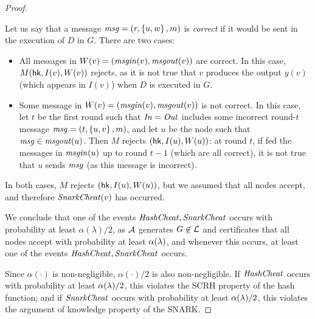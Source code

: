 \begin{proof}
\begin{itemize}
			Let us say that a message $\mathit{ msg } = (r, \left \{{u,w} \right \}, m)$
			is \emph{correct} if it would be sent in the execution of $D$ in $G$.
			There are two cases:
			\begin{itemize}
				\item All messages in $W(v) = (\mathit{ msgin }(v), \mathit{ msgout }(v))$
					are correct.
					In this case, $M( \mathsf{hk}, I(v), W(v))$
					rejects, as it is not true that $v$
					produces the output $y(v)$ (which appears in $I(v)$)
					when $D$ is executed in $G$.
				\item Some message in $W(v) = (\mathit{ msgin }(v), \mathit{ msgout }(v))$
					is not correct.
					In this case,
				let $t$ be the first round such that $\mathit{ In } = \mathit{ Out }$ 
			includes some incorrect round-$t$ message $\mathit{ msg } = (t, \left \{{u,v} \right \}, m)$,
			and let $u$ be the node such that $\mathit{ msg } \in \mathit{ msgout }(u)$.
			Then $M$ rejects $(\mathsf{hk}, I(u), W(u))$:
			at round $t$, if fed the messages in $\mathit{ msgin }(u)$ up to round $t - 1$
			(which are all correct),
			it is not true that $u$ sends $\mathit{ msg }$ (as this message is incorrect).
			\end{itemize}
			In both cases, $M$ rejects $(\mathsf{hk}, I(u), W(u))$,
			but we assumed that all nodes accept,
			and therefore $\mathit{ SnarkCheat }(v)$ has occurred.
	\end{itemize}
	We conclude that one of the events $\mathit{ HashCheat },\mathit{ SnarkCheat }$
	occurs with probability at least $\alpha(\lambda)/2$,
	as $\mathcal{A}$ generates $G \not \in \mathcal{L}$ and certificates that all nodes accept
	with probability at least $\alpha(\lambda)$,
	and whenever this occurs, at least one of the events 
 	$\mathit{ HashCheat }, \mathit{ SnarkCheat }$ occurs.

	Since $\alpha(\cdot)$ is non-negligible, $\alpha(\cdot) / 2$
	is also non-negligible.
	If $\mathit{ HashCheat }$ occurs with probability at least $\alpha(\lambda) / 2$,
	this violates the SCRH property of the hash function;
	and if $\mathit{ SnarkCheat }$ occurs with probability at least $\alpha(\lambda) / 2$,
	this violates the argument of knowledge property of the SNARK.
\end{proof}

